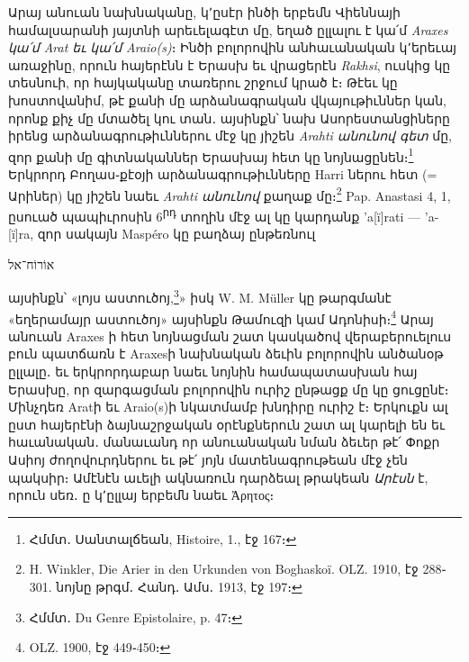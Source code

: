 \documentclass{article}
\begin{document}
{Արայ անուան նախնականը, կ՚ըսէր ինծի երբեմն Վիեննայի համալսարանի յայտնի արեւելագէտ մը, եղած ըլլալու է կա՛մ \emph{Araxes կա՛մ Arat եւ կա՛մ Araio(s)}։ Ինծի բոլորովին անհաւանական կ՚երեւայ առաջինը, որուն հայերէնն է Երասխ եւ վրացերէն \emph{Rakhsi}, ուսկից կը տեսնուի, որ հայկականը տառերու շրջում կրած է։ Թէեւ կը խոստովանիմ, թէ քանի մը արձանագրական վկայութիւններ կան, որոնք քիչ մը մտածել կու տան․ այսինքն՝ նախ Ասորեստանցիները իրենց արձանագրութիւններու մէջ կը յիշեն \emph{Arahti անունով գետ} մը, զոր քանի մը գիտնականներ Երասխայ հետ կը նոյնացընեն։\footnote{Հմմտ․ Սանտալճեան, Histoire, 1., էջ 167։} Երկրորդ Բողաս֊քէօյի արձանագրութիւնները Harri ներու հետ (= Արիներ) կը յիշեն նաեւ \emph{Arahti անունով} քաղաք մը։\footnote{H. Winkler, Die Arier in den Urkunden von Boghaskoï. OLZ. 1910, էջ 288֊301. նոյնը թրգմ․ Հանդ․ Ամս․ 1913, էջ 197։} Pap. Anastasi 4, 1, ըսուած պապիւրոսին 6\textsuperscript{րդ} տողին մէջ ալ կը կարդանք 'a[ï]rati — 'a-[ï]ra, զոր սակայն Maspéro կը բաղձայ ընթեռնուլ \begin{hebrewfont}אוֹרוֹח־אל\end{hebrewfont} այսինքն՝ «լոյս աստուծոյ,\footnote{Հմմտ․ Du Genre Epistolaire, p. 47։}» իսկ W. M. Müller կը թարգմանէ «եղերամայր աստուծոյ» այսինքն Թամուզի կամ Ադոնիսի։\footnote{OLZ. 1900, էջ 449֊450։} Արայ անուան Araxes ի հետ նոյնացման շատ կասկածով վերաբերուելուս բուն պատճառն է Araxesի նախնական ձեւին բոլորովին անծանօթ ըլլալը․ եւ երկրորդաբար նաեւ նոյնին համապատասխան հայ Երասխը, որ զարգացման բոլորովին ուրիշ ընթացք մը կը ցուցընէ։ Մինչդեռ Aratի եւ Araio(s)ի նկատմամբ խնդիրը ուրիշ է։ Երկուքն ալ ըստ հայերէնի ձայնաշրջական օրէնքներուն շատ ալ կարելի են եւ հաւանական․ մանաւանդ որ անուանական նման ձեւեր թէ՛ Փոքր Ասիոյ ժողովուրդներու եւ թէ՛ յոյն մատենագրութեան մէջ չեն պակսիր։ Ամէնէն աւելի ակնառուն դարձեալ թրակեան \emph{Արէսն} է, որուն սեռ․ ը կ՚ըլլայ երբեմն նաեւ Ἀρητος։

}
\end{document}
